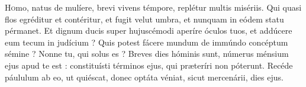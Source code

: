 \lettrine{H}omo, natus de mulíere, brevi vivens témpore, replétur multis misériis.
Qui quasi flos egréditur et contéritur, et fugit velut umbra, et nunquam in eódem statu pérmanet.
Et dignum ducis super hujuscémodi aperíre óculos tuos, et addúcere eum tecum in judícium ?
Quis potest fácere mundum de immúndo concéptum sémine ? Nonne tu, qui solus es ?
Breves dies hóminis sunt, númerus ménsium ejus apud te est : constituísti términos ejus, qui præteríri non póterunt.
Recéde páululum ab eo, ut quiéscat, donec optáta véniat, sicut mercenárii, dies ejus.